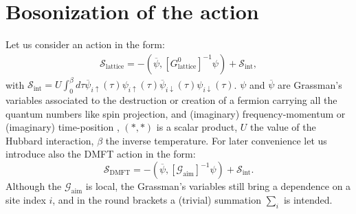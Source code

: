 \documentclass[a4paper,11pt]{article}
\begin{document}
\section*{Bosonization of the action} 

Let us consider an action in the form: 
\begin{eqnarray}
\label{slattice} 
\mathcal{S}_{\mathrm{lattice}} = -(\overline \psi, [G^0_{\mathrm{lattice}}]^{-1}\psi)+\mathcal{S}_{\mathrm{int}},
\end{eqnarray}
with $\mathcal{S}_{\mathrm{int}}=U\int_0^\beta d\tau \overline \psi_{i\uparrow}(\tau) \psi_{i\uparrow}(\tau)\overline \psi_{i\downarrow}(\tau) \psi_{i\downarrow}(\tau)$. 
$\psi$ and $\overline \psi$ are Grassman's variables associated to the destruction or creation of a fermion carrying all the quantum numbers like spin projection, and (imaginary) frequency-momentum or (imaginary) time-position , $(*,*)$ is a scalar product, $U$ the value of the Hubbard interaction, $\beta$ the inverse temperature. 
For later convenience let us introduce also the DMFT action in the form: 
\begin{equation}
\label{sdmft}
\mathcal{S}_{\mathrm{DMFT}} = -(\overline \psi, [\mathcal{G}_{\mathrm{aim}}]^{-1}\psi)+\mathcal{S}_{\mathrm{int}}. 
\end{equation}
Although the $\mathcal{G}_{\mathrm{aim}}$ is local, the Grassman's variables still bring a dependence on a site index $i$, and in the round brackets a (trivial) summation $\sum_i$ is intended. 
\end{document}
